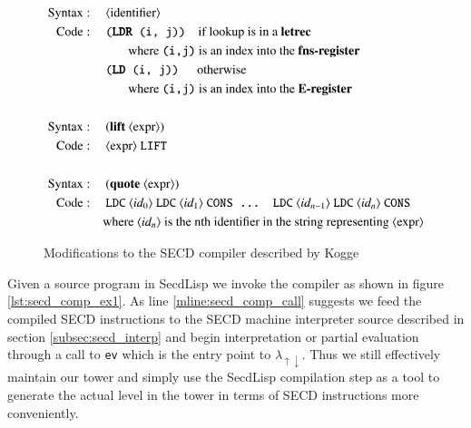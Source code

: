 \documentclass[a4paper,12pt,twoside,openright]{report}
\theoremstyle{definition}
\newcommand{\mslang}{$\lambda_{\uparrow\downarrow}$}
\newcommand{\secdlisp}{SecdLisp}
\begin{document}
\begin{figure}[ht!]
\centering
\begin{alignat}{5}
		\text{Syntax}   & : && \: \text{$\langle$identifier$\rangle$} \\
		\text{Code}     & : && \: \texttt{(\textbf{LDR} (i, j))} \quad \text{if lookup is in a \textbf{letrec}} \nonumber \\
		& && \qquad\text{where \texttt{(i,j)} is an index into the \textbf{fns-register}} \nonumber \\
		& && \: \texttt{(\textbf{LD} (i, j))} \quad\:\: \text{otherwise} \nonumber \\
		& && \qquad\text{where \texttt{(i,j)} is an index into the \textbf{E-register}} \nonumber \\
		\nonumber \\%
		\text{Syntax}   & : && \: \text{(\textbf{lift} $\langle$expr$\rangle$)} \\
		\text{Code}     & : && \: \text{$\langle$expr$\rangle$ \texttt{LIFT}} \nonumber \\
		\nonumber \\%
		\text{Syntax}   & : && \: \text{(\textbf{quote} $\langle$expr$\rangle$)} \label{eq:secd_comp_sem_quote} \\
		\text{Code}     & : && \: \text{\texttt{LDC} $\langle id_{0} \rangle$ \texttt{LDC} $\langle id_{1} \rangle$ \texttt{CONS ... LDC} $\langle id_{n-1} \rangle$ \texttt{LDC} $\langle id_{n} \rangle$ \texttt{CONS}} \nonumber \\
		& && \text{where $\langle id_{n} \rangle$ is the nth identifier in the string representing $\langle$expr$\rangle$} \nonumber
\end{alignat}
\caption{Modifications to the SECD compiler described by Kogge \cite{kogge1990architecture}}
\label{fig:secd_comp_semantics}
\end{figure}

Given a source program in \secdlisp{} we invoke the compiler as shown in figure \ref{lst:secd_comp_ex1}. As line \ref{mline:secd_comp_call} suggests we feed the compiled SECD instructions to the SECD machine interpreter source described in section \ref{subsec:secd_interp} and begin interpretation or partial evaluation through a call to \texttt{ev} which is the entry point to \mslang. Thus we still effectively maintain our tower and simply use the \secdlisp{} compilation step as a tool to generate the actual level in the tower in terms of SECD instructions more conveniently.
\end{document}
